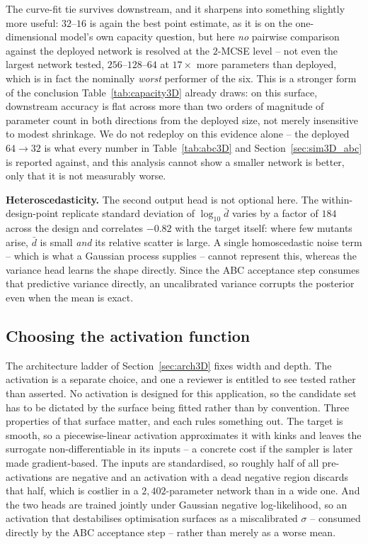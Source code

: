 \documentclass[sn-basic,iicol,pdflatex]{sn-jnl}
\newcommand{\dbar}{\ensuremath{\bar d}}
\begin{document}
The curve-fit tie survives downstream, and it sharpens into something slightly
more useful: $32$--$16$ is again the best point estimate, as it is on the
one-dimensional model's own capacity question, but here \emph{no} pairwise
comparison against the deployed network is resolved at the $2$-MCSE level --
not even the largest network tested, $256$--$128$--$64$ at $17\times$ more
parameters than deployed, which is in fact the nominally \emph{worst}
performer of the six. This is a stronger form of the conclusion
Table~\ref{tab:capacity3D} already draws: on this surface, downstream
accuracy is flat across more than two orders of magnitude of parameter count
in both directions from the deployed size, not merely insensitive to modest
shrinkage. We do not redeploy on this evidence alone -- the deployed $64\to32$
is what every number in Table~\ref{tab:abc3D} and Section~\ref{sec:sim3D_abc}
is reported against, and this analysis cannot show a smaller network is
better, only that it is not measurably worse.

\noindent\textbf{Heteroscedasticity.} The second output head is not optional here. The
within-design-point replicate standard deviation of $\log_{10}\dbar$ varies by a
factor of $184$ across the design and correlates $-0.82$ with the target itself:
where few mutants arise, $\dbar$ is small \emph{and} its relative scatter is
large. A single homoscedastic noise term -- which is what a Gaussian process
supplies -- cannot represent this, whereas the variance head learns the shape
directly. Since the ABC acceptance step consumes that predictive variance
directly, an uncalibrated variance corrupts the posterior even when the mean is
exact.

\subsection{Choosing the activation function}
\label{sec:sim3D_act}

The architecture ladder of Section~\ref{sec:arch3D} fixes width and depth. The
activation is a separate choice, and one a reviewer is entitled to see tested
rather than asserted. No activation is designed for this application, so the
candidate set has to be dictated by the surface being fitted rather than by
convention. Three properties of that surface matter, and each rules something
out. The target is smooth, so a piecewise-linear activation
approximates it with kinks and leaves the surrogate non-differentiable in its
inputs -- a concrete cost if the sampler is later made gradient-based. The
inputs are standardised, so roughly half of all pre-activations are negative and
an activation with a dead negative region discards that half, which is costlier
in a $2{,}402$-parameter network than in a wide one. And the two heads are
trained jointly under Gaussian negative log-likelihood, so an activation that
destabilises optimisation surfaces as a miscalibrated $\sigma$ -- consumed
directly by the ABC acceptance step -- rather than merely as a worse mean.
\end{document}
